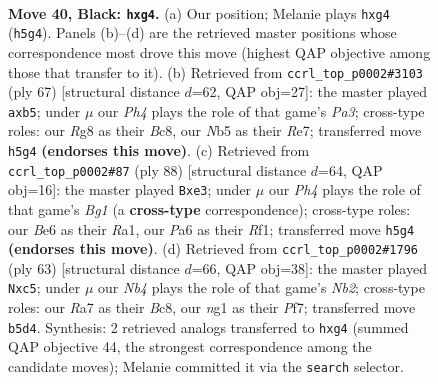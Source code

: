 \documentclass[11pt]{article}
\begin{document}
\clearpage

\begin{figure}[p]\centering
\begin{subfigure}{0.46\textwidth}\centering
\resizebox{\linewidth}{!}{%
\newchessgame
\chessboard[
  setfen={6r1/r7/p1B1bk2/Bn4pp/5pP1/PP3P2/1K5P/R4RN1 b - - 0 40},
  showmover=false,
  pgfstyle=straightmove, color=movearrow, markmove={h5-g4}
]}
\caption{}
\end{subfigure}\hfill
\begin{subfigure}{0.46\textwidth}\centering
\resizebox{\linewidth}{!}{%
\newchessgame
\chessboard[
  setfen={1kb5/4rr1p/p2n2p1/1PpP4/6PR/1PN2P2/3KB3/7R b - - 0 34},
  showmover=false,
  pgfstyle=straightmove, color=movearrow, markmove={a6-b5}
]}
\caption{}
\end{subfigure}
\\[4pt]
\begin{subfigure}{0.46\textwidth}\centering
\resizebox{\linewidth}{!}{%
\newchessgame
\chessboard[
  setfen={4rrn1/2p5/2k5/2p1P3/1p3p1p/4bN1P/1PP3P1/R4RBK w - - 0 45},
  showmover=false,
  pgfstyle=straightmove, color=movearrow, markmove={g1-e3}
]}
\caption{}
\end{subfigure}\hfill
\begin{subfigure}{0.46\textwidth}\centering
\resizebox{\linewidth}{!}{%
\newchessgame
\chessboard[
  setfen={r1b5/pn3pk1/B3r2p/2Pp4/1N2p3/5P2/P1R3P1/5RK1 b - - 1 32},
  showmover=false,
  pgfstyle=straightmove, color=movearrow, markmove={b7-c5}
]}
\caption{}
\end{subfigure}
\caption{\textbf{Move 40, Black: \texttt{hxg4}.} (a) Our position; Melanie plays \texttt{hxg4} (\texttt{h5g4}). Panels (b)--(d) are the retrieved master positions whose correspondence most drove this move (highest QAP objective among those that transfer to it). (b) Retrieved from \texttt{ccrl\_top\_p0002\#3103} (ply 67) [structural distance $d$=62, QAP obj=27]: the master played \texttt{axb5}; under $\mu$ our \emph{Ph4} plays the role of that game's \emph{Pa3}; cross-type roles: our \emph{R}g8 as their \emph{B}c8, our \emph{N}b5 as their \emph{R}e7; transferred move \texttt{h5g4} \textbf{(endorses this move)}. (c) Retrieved from \texttt{ccrl\_top\_p0002\#87} (ply 88) [structural distance $d$=64, QAP obj=16]: the master played \texttt{Bxe3}; under $\mu$ our \emph{Ph4} plays the role of that game's \emph{Bg1} (a \textbf{cross-type} correspondence); cross-type roles: our \emph{B}e6 as their \emph{R}a1, our \emph{P}a6 as their \emph{R}f1; transferred move \texttt{h5g4} \textbf{(endorses this move)}. (d) Retrieved from \texttt{ccrl\_top\_p0002\#1796} (ply 63) [structural distance $d$=66, QAP obj=38]: the master played \texttt{Nxc5}; under $\mu$ our \emph{Nb4} plays the role of that game's \emph{Nb2}; cross-type roles: our \emph{R}a7 as their \emph{B}c8, our \emph{n}g1 as their \emph{P}f7; transferred move \texttt{b5d4}. Synthesis: 2 retrieved analogs transferred to \texttt{hxg4} (summed QAP objective 44, the strongest correspondence among the candidate moves); Melanie committed it via the \texttt{search} selector.}
\label{fig:thought-m79}
\end{figure}
\end{document}
